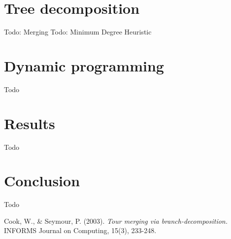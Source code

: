 \documentclass[12pt]{article}
\begin{document}
\section{Tree decomposition}
\label{sec:td}
Todo: Merging
Todo: Minimum Degree Heuristic



%
%
\section{Dynamic programming}
\label{sec:dp}
Todo



%
%
\section{Results}
\label{sec:results}
Todo



%
%
\section{Conclusion}
\label{sec:conclusion}
Todo



%
%
\begin{thebibliography}{9}
        Cook, W., & Seymour, P. (2003).
        \emph{Tour merging via branch-decomposition.}
        INFORMS Journal on Computing, 15(3), 233-248.

\end{thebibliography}
\end{document}

